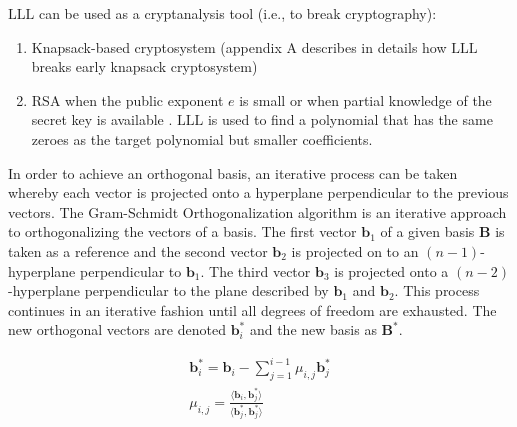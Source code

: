 
$\mathrm{LLL}$ can be used as a cryptanalysis tool (i.e., to break cryptography):

\begin{enumerate}
    \item Knapsack-based cryptosystem \cite{doi:10.1137/0215038} (appendix A describes in details how $\mathrm{LLL}$ breaks early knapsack cryptosystem)
    \item RSA when the public exponent $e$ is small or when partial knowledge of the secret key is available \cite{Wang:2015:MFP:2901632} \cite{Coppersmith:2001:FSS:648244.753513}. $\mathrm{LLL}$ is used to find a polynomial that has the same zeroes as the target polynomial but smaller coefficients. 
\end{enumerate}



In order to achieve an orthogonal basis, an iterative process can be taken whereby each vector is projected onto a hyperplane perpendicular to the previous vectors. The Gram-Schmidt Orthogonalization algorithm is an iterative approach to orthogonalizing the vectors of a basis. The first vector $\textbf{b}_1$ of a given basis $\textbf{B}$ is taken as a reference and the second vector $\textbf{b}_2$ is projected on to an $(n - 1)$-hyperplane perpendicular to $\textbf{b}_1$. The third vector $\textbf{b}_3$ is projected onto a $(n - 2)$-hyperplane perpendicular to the plane described by $\textbf{b}_1$ and $\textbf{b}_2$. This process continues in an iterative fashion until all degrees of freedom are exhausted. The new orthogonal vectors are denoted $\textbf{b}^*_i$ and the new basis as $\textbf{B}^*$.


\begin{equation}
\begin{split}
	\textbf{b}^{*}_{i} = \textbf{b}_i - \sum_{j=1}^{i-1}{\mu_{i, j}\textbf{b}^*_j}\\
	\mu_{i, j} = \frac{\langle \textbf{b}_i , \textbf{b}_j^*\rangle}{\langle \textbf{b}_j^*, \textbf{b}_j^*\rangle}
\end{split}
\end{equation}

